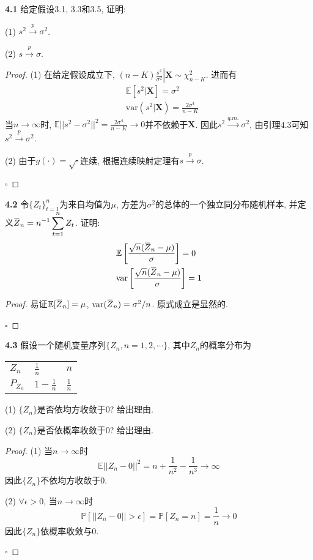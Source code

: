 \documentclass[cn,12pt,math=mtpro2,citestyle=gb7714-2015,bibstyle=gb7714-2015,twocol,mode=simple]{elegantbook}
\newcommand{\overbar}[1]{\mkern 1.5mu\overline{\mkern-1.5mu#1\mkern-1.5mu}\mkern 1.5mu}
\newcommand{\E}{\mathbb{E}}
\newcommand{\var}{\text{var}}
\begin{document}
\textbf{4.1} 给定假设3.1, 3.3和3.5, 证明:

(1) $s^2\xrightarrow{p}\sigma^2$.

(2) $s\xrightarrow{p}\sigma$.

\begin{proof}
  (1) 在给定假设成立下, $\displaystyle(n-K)\left.\frac{s^2}{\sigma^2}\right|\mathbf{X}\sim\chi^2_{n-K}$. 进而有
  \begin{align*}
  &\E[s^2|\mathbf{X}]=\sigma^2 \\
  &\var(s^2|\mathbf{X})=\frac{2\sigma^4}{n-K}
  \end{align*}
  当$n\rightarrow\infty$时, $\displaystyle\E||s^2-\sigma^2||^2=\frac{2\sigma^4}{n-K}\rightarrow 0$并不依赖于$\mathbf{X}$. 因此$s^2\xrightarrow{q.m.}\sigma^2$, 由引理4.3可知$s^2\xrightarrow{p}\sigma^2$.

  (2) 由于$g(\cdot)=\sqrt{\cdot}$连续, 根据连续映射定理有$s\xrightarrow{p}\sigma$.

  $\square$
  \end{proof}

\textbf{4.2} 令$\{Z_t\}_{t=1}^n$为来自均值为$\mu$, 方差为$\sigma^2$的总体的一个独立同分布随机样本, 并定义$\displaystyle \overbar{Z}_n=n^{-1}\sum_{t=1}^{n}Z_t$. 证明:
  \begin{align*}
  &\E\left[\frac{\sqrt{n}(\overbar{Z}_n-\mu)}{\sigma}\right]=0 \\
  &\var\left[\frac{\sqrt{n}(\overbar{Z}_n-\mu)}{\sigma}\right]=1
  \end{align*}
  \begin{proof}
    易证$\E[\overbar{Z}_n]=\mu$, $\var(\overbar{Z}_n)=\sigma^2/n$. 原式成立是显然的.

    $\square$
  \end{proof}

 \textbf{4.3} 假设一个随机变量序列$\{Z_n, n=1,2,\cdots\}$, 其中$Z_n$的概率分布为
\begin{table}[!htbp]
\centering
\begin{tabular}{lll}
$Z_n$     & $\displaystyle \frac{1}{n}$   & $n$                           \\
$P_{Z_n}$ & $\displaystyle 1-\frac{1}{n}$ & $\displaystyle \frac{1}{n}$
\end{tabular}
\end{table}

(1) $\{Z_n\}$是否依均方收敛于0? 给出理由.

(2) $\{Z_n\}$是否依概率收敛于0? 给出理由.

\begin{proof}
  (1) 当$n\rightarrow\infty$时
   $$\displaystyle\E||Z_n-0||^2=n+\frac{1}{n^2}-\frac{1}{n^3}\rightarrow\infty$$
  因此$\{Z_n\}$不依均方收敛于0.

  (2) $\forall \epsilon>0$, 当$n\rightarrow\infty$时
  $$\mathbb{P}[||Z_n-0||>\epsilon]=\mathbb{P}[Z_n=n]=\frac{1}{n}\rightarrow 0$$
  因此$\{Z_n\}$依概率收敛与0.

  $\square$
\end{proof}
\end{document}
